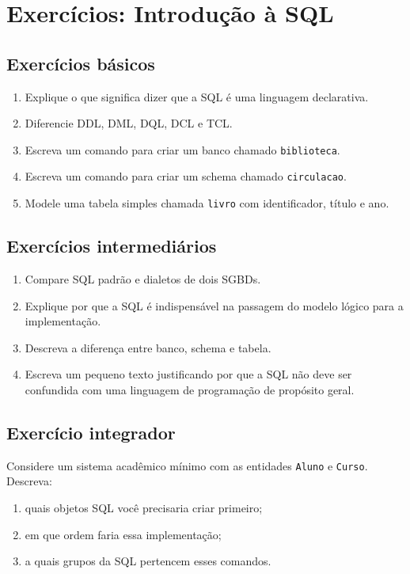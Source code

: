 \section{Exercícios: Introdução à SQL}
\subsection{Exercícios básicos}

\begin{enumerate}
    \item Explique o que significa dizer que a SQL é uma linguagem declarativa.
    \item Diferencie DDL, DML, DQL, DCL e TCL.
    \item Escreva um comando para criar um banco chamado \texttt{biblioteca}.
    \item Escreva um comando para criar um schema chamado \texttt{circulacao}.
    \item Modele uma tabela simples chamada \texttt{livro} com identificador, título e ano.
\end{enumerate}

\subsection{Exercícios intermediários}

\begin{enumerate}
    \item Compare SQL padrão e dialetos de dois SGBDs.
    \item Explique por que a SQL é indispensável na passagem do modelo lógico para a implementação.
    \item Descreva a diferença entre banco, schema e tabela.
    \item Escreva um pequeno texto justificando por que a SQL não deve ser confundida com uma linguagem de programação de propósito geral.
\end{enumerate}

\subsection{Exercício integrador}

Considere um sistema acadêmico mínimo com as entidades \texttt{Aluno} e \texttt{Curso}. Descreva:
\begin{enumerate}
    \item quais objetos SQL você precisaria criar primeiro;
    \item em que ordem faria essa implementação;
    \item a quais grupos da SQL pertencem esses comandos.
\end{enumerate}



